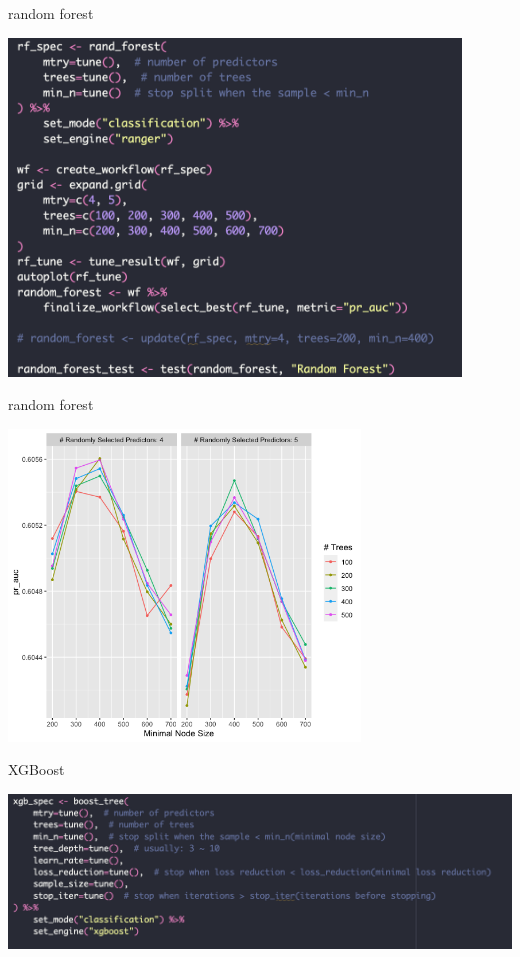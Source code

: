 \documentclass[
  ignorenonframetext,
]{beamer}
\begin{document}
\begin{frame}{random forest}
  \begin{center}
    \includegraphics[width=0.9\textwidth]{figure/pdf/rf.png}
  \end{center}
\end{frame}


\begin{frame}{random forest}
  \begin{center}
    \includegraphics[width=0.7\textwidth]{figure/pdf/rf_tune.png}
  \end{center}
\end{frame}


\begin{frame}{XGBoost}
  \begin{center}
    \includegraphics{figure/pdf/xgb1.png}
  \end{center}
\end{frame}
\end{document}
